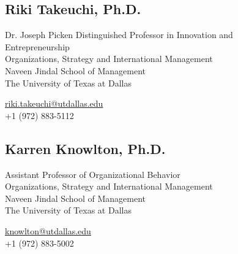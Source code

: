 \documentclass[12pt,letterpaper]{report} %
\begin{document}
    \subsection*{Riki Takeuchi, Ph.D.}
        \begin{minipage}[t]{0.700\textwidth}
        Dr. Joseph Picken Distinguished Professor in Innovation and \\Entrepreneurship\\
        Organizations, Strategy and International Management\\
        Naveen Jindal School of Management\\
        The University of Texas at Dallas
        \end{minipage}
        \begin{minipage}[t]{0.295\textwidth}
        \flushright{}
        \href{mailto:riki.takeuchi@utdallas.edu}{riki.takeuchi@utdallas.edu} \\
        +1 (972) 883-5112
        \end{minipage}
        
    \subsection*{Karren Knowlton, Ph.D.}
        \begin{minipage}[t]{0.700\textwidth}
        Assistant Professor of Organizational Behavior\\
        Organizations, Strategy and International Management\\
        Naveen Jindal School of Management\\
        The University of Texas at Dallas
        \end{minipage}
        \begin{minipage}[t]{0.295\textwidth}
        \flushright{}
        \href{mailto:knowlton@utdallas.edu}{knowlton@utdallas.edu} \\
        +1 (972) 883-5002
        \end{minipage}
\end{document}
